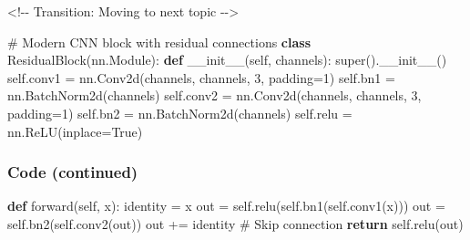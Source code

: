 \documentclass[
]{article}
\newenvironment{Shaded}{\begin{snugshade}}{\end{snugshade}}
\newcommand{\BuiltInTok}[1]{\textcolor[rgb]{0.00,0.23,0.31}{#1}}
\newcommand{\CommentTok}[1]{\textcolor[rgb]{0.37,0.37,0.37}{#1}}
\newcommand{\ControlFlowTok}[1]{\textcolor[rgb]{0.00,0.23,0.31}{\textbf{#1}}}
\newcommand{\DecValTok}[1]{\textcolor[rgb]{0.68,0.00,0.00}{#1}}
\newcommand{\FunctionTok}[1]{\textcolor[rgb]{0.28,0.35,0.67}{#1}}
\newcommand{\KeywordTok}[1]{\textcolor[rgb]{0.00,0.23,0.31}{\textbf{#1}}}
\newcommand{\NormalTok}[1]{\textcolor[rgb]{0.00,0.23,0.31}{#1}}
\newcommand{\OperatorTok}[1]{\textcolor[rgb]{0.37,0.37,0.37}{#1}}
\newcommand{\VariableTok}[1]{\textcolor[rgb]{0.07,0.07,0.07}{#1}}
\begin{document}
\begin{Shaded}
\begin{Highlighting}[]


\OperatorTok{\textless{}!{-}{-}}\NormalTok{ Transition: Moving to }\BuiltInTok{next}\NormalTok{ topic }\OperatorTok{{-}{-}\textgreater{}}



\CommentTok{\# Modern CNN block with residual connections}
\KeywordTok{class}\NormalTok{ ResidualBlock(nn.Module):}
    \KeywordTok{def} \FunctionTok{\_\_init\_\_}\NormalTok{(}\VariableTok{self}\NormalTok{, channels):}
        \BuiltInTok{super}\NormalTok{().}\FunctionTok{\_\_init\_\_}\NormalTok{()}
        \VariableTok{self}\NormalTok{.conv1 }\OperatorTok{=}\NormalTok{ nn.Conv2d(channels, channels, }\DecValTok{3}\NormalTok{, padding}\OperatorTok{=}\DecValTok{1}\NormalTok{)}
        \VariableTok{self}\NormalTok{.bn1 }\OperatorTok{=}\NormalTok{ nn.BatchNorm2d(channels)}
        \VariableTok{self}\NormalTok{.conv2 }\OperatorTok{=}\NormalTok{ nn.Conv2d(channels, channels, }\DecValTok{3}\NormalTok{, padding}\OperatorTok{=}\DecValTok{1}\NormalTok{)}
        \VariableTok{self}\NormalTok{.bn2 }\OperatorTok{=}\NormalTok{ nn.BatchNorm2d(channels)}
        \VariableTok{self}\NormalTok{.relu }\OperatorTok{=}\NormalTok{ nn.ReLU(inplace}\OperatorTok{=}\VariableTok{True}\NormalTok{)}
        
\end{Highlighting}
\end{Shaded}

\subsubsection{Code (continued)}\label{code-continued}

\begin{Shaded}
\begin{Highlighting}[]
    \KeywordTok{def}\NormalTok{ forward(}\VariableTok{self}\NormalTok{, x):}
\NormalTok{        identity }\OperatorTok{=}\NormalTok{ x}
\NormalTok{        out }\OperatorTok{=} \VariableTok{self}\NormalTok{.relu(}\VariableTok{self}\NormalTok{.bn1(}\VariableTok{self}\NormalTok{.conv1(x)))}
\NormalTok{        out }\OperatorTok{=} \VariableTok{self}\NormalTok{.bn2(}\VariableTok{self}\NormalTok{.conv2(out))}
\NormalTok{        out }\OperatorTok{+=}\NormalTok{ identity  }\CommentTok{\# Skip connection}
        \ControlFlowTok{return} \VariableTok{self}\NormalTok{.relu(out)}
\end{Highlighting}
\end{Shaded}
\end{document}

